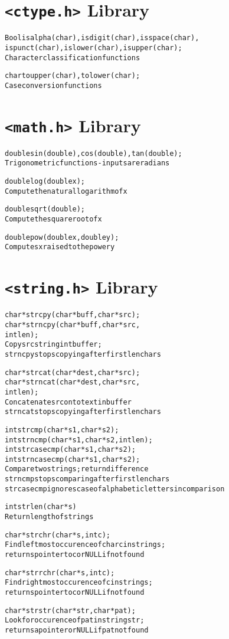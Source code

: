 \documentclass[twocolumn,12pt]{article}
\begin{document}
\section*{\texttt{<ctype.h>} Library}
\begin{alltt}
Bool isalpha(char), isdigit(char), isspace(char),
     ispunct(char), islower(char), isupper(char);
   \textrm{Character classification functions}

char toupper(char), tolower(char);
   \textrm{Case conversion functions}
\end{alltt}

\section*{\texttt{<math.h>} Library}
\begin{alltt}
double sin(double), cos(double), tan(double);
   \textrm{Trigonometric functions - inputs are radians}

double log(double x);
   \textrm{Compute the natural logarithm of} x

double sqrt(double);
   \textrm{Compute the square root of} x

double pow(double x, double y);
   \textrm{Computes} x {raised to the power} y
\end{alltt}

\section*{\texttt{<string.h>} Library}
\begin{alltt}
char *strcpy(char *buff, char *src);
char *strncpy(char *buff, char *src,
                            int len);
   \textrm{Copy} src \textrm{string int} buffer;
   strncpy \textrm{stops copying after first} len \textrm{chars}

char *strcat(char *dest, char *src);
char *strncat(char *dest, char *src,
                            int len);
   \textrm{Concatenate} src \textrm{onto text in} buffer
   strncat \textrm{stops copying after first} len \textrm{chars}

int strcmp(char *s1, char *s2);
int strncmp(char *s1, char *s2, int len);
int strcasecmp(char *s1, char *s2);
int strncasecmp(char *s1, char *s2);
   \textrm{Compare two strings; return difference}
   strncmp \textrm{stops comparing after first} len \textrm{chars}
   strcasecmp \textrm{ignores case of alphabetic letters in comparison}

int strlen(char *s)
   \textrm{Return length of string} s

char *strchr(char *s, int c);
   \textrm{Find leftmost occurence of char} c \textrm{in string} s\textrm{;}
   \textrm{returns pointer to} c \textrm{or} NULL \textrm{if not found}

char *strrchr(char *s, int c);
   \textrm{Find rightmost occurence of} c \textrm{in string} s\textrm{;}
   \textrm{returns pointer to} c \textrm{or} NULL \textrm{if not found}

char *strstr(char *str, char *pat);
   \textrm{Look for occurence of} pat \textrm{in string} str\textrm{;}
   \textrm{returns a pointer or} NULL \textrm{if} pat \textrm{not found}
\end{alltt}
\end{document}
